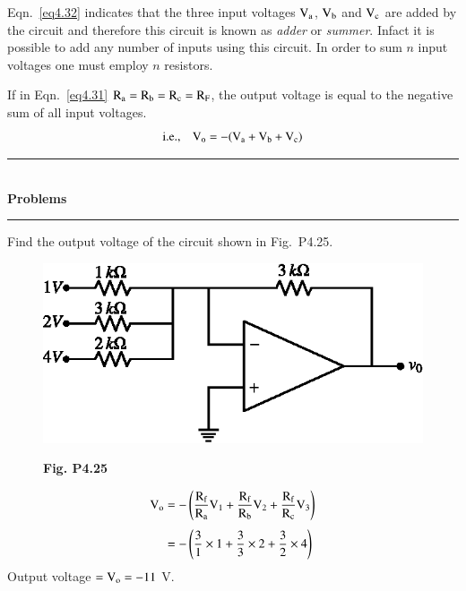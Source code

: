 Eqn.~\eqref{eq4.32} indicates that the three input voltages $\textrm{V}_{\textrm{a}}$, $\textrm{V}_{\textrm{b}}$ and $\textrm{V}_{\textrm{c}}$ are added by the circuit and therefore this circuit is known as {\em adder} or {\em summer}. Infact it is possible to add any number of inputs using this circuit. In order to sum $n$ input voltages one must employ $n$ resistors.

If in Eqn.~\eqref{eq4.31} $\textrm{R}_{\textrm{a}}=\textrm{R}_{\textrm{b}}=\textrm{R}_{\textrm{c}}=\textrm{R}_{\textrm{F}}$, the output voltage is equal to the negative sum of all input voltages.
\begin{equation}
\text{i.e.,}\quad \textrm{V}_{\textrm{o}}=-(\textrm{V}_{\textrm{a}}+\textrm{V}_{\textrm{b}}+\textrm{V}_{\textrm{c}})\label{eq4.33}
\end{equation}

\begin{center}
\rule{4cm}{1pt}\\
{\bf\Large Problems}\\[-3pt]
\rule{4cm}{1pt}
\end{center}

\begin{problem}\label{prob4.25}
Find the output voltage of the circuit shown in Fig.~P4.25.
\begin{figure}[H]
\centering
\includegraphics{chap4/figP4.24a.eps}

\smallskip
{\bf Fig. P4.25}
\end{figure}
\end{problem}

\begin{solution}
\begin{align*}
\textrm{V}_{\textrm{o}} &= -\left(\frac{\textrm{R}_{\textrm{f}}}{\textrm{R}_{\textrm{a}}}\textrm{V}_{1}+\frac{\textrm{R}_{\textrm{f}}}{\textrm{R}_{\textrm{b}}}\textrm{V}_{2}+\frac{\textrm{R}_{\textrm{f}}}{\textrm{R}_{\textrm{c}}}\textrm{V}_{3}\right)\\[3pt]
&= - \left(\frac{3}{1}\times 1+\frac{3}{3}\times 2+\frac{3}{2}\times 4\right)
\end{align*}
Output voltage $=\textrm{V}_{\textrm{o}}=-11$ V.
\end{solution}

